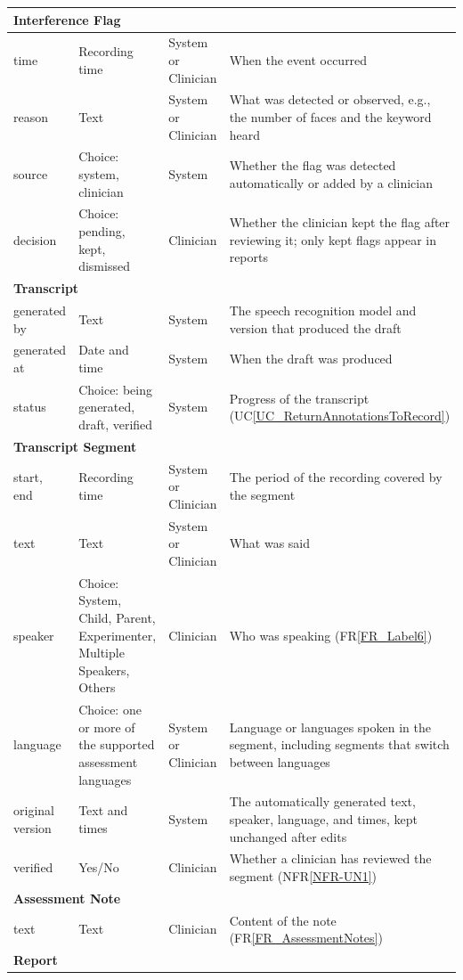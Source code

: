 \documentclass[12pt]{article}
\newcommand{\ucref}[1]{UC\ref{#1}}
\newcommand{\rref}[1]{FR\ref{#1}}
\newcommand{\nfrref}[1]{NFR\ref{#1}}
\begin{document}
\begin{longtable}{p{} p{} p{} p{}}
\midrule
\multicolumn{4}{l}{\textbf{Interference Flag}}\\
\midrule
time & Recording time & System or Clinician & When the event occurred\\
reason & Text & System or Clinician & What was detected or observed, e.g., the number of faces and the keyword heard\\
source & Choice: system, clinician & System & Whether the flag was detected automatically or added by a clinician\\
decision & Choice: pending, kept, dismissed & Clinician & Whether the clinician kept the flag after reviewing it; only kept flags appear in reports\\
\midrule
\multicolumn{4}{l}{\textbf{Transcript}}\\
\midrule
generated by & Text & System & The speech recognition model and version that produced the draft\\
generated at & Date and time & System & When the draft was produced\\
status & Choice: being generated, draft, verified & System & Progress of the transcript (\ucref{UC_ReturnAnnotationsToRecord})\\
\midrule
\multicolumn{4}{l}{\textbf{Transcript Segment}}\\
\midrule
start, end & Recording time & System or Clinician & The period of the recording covered by the segment\\
text & Text & System or Clinician & What was said\\
speaker & Choice: System, Child, Parent, Experimenter, Multiple Speakers, Others & Clinician & Who was speaking (\rref{FR_Label6})\\
language & Choice: one or more of the supported assessment languages & System or Clinician & Language or languages spoken in the segment, including segments that switch between languages\\
original version & Text and times & System & The automatically generated text, speaker, language, and times, kept unchanged after edits\\
verified & Yes/No & Clinician & Whether a clinician has reviewed the segment (\nfrref{NFR-UN1})\\
\midrule
\multicolumn{4}{l}{\textbf{Assessment Note}}\\
\midrule
text & Text & Clinician & Content of the note (\rref{FR_AssessmentNotes})\\
\midrule
\multicolumn{4}{l}{\textbf{Report}}\\

\end{longtable}
\end{document}
